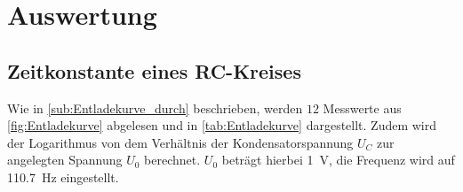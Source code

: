 \section{Auswertung}
\label{sec:Auswertung}

\subsection{Zeitkonstante eines RC-Kreises} %
\label{sub:Zeitkonstante_aus}

\noindent Wie in \autoref{sub:Entladekurve_durch} beschrieben, werden $12$ Messwerte aus \autoref{fig:Entladekurve} abgelesen und in \autoref{tab:Entladekurve} dargestellt.
Zudem wird der Logarithmus von dem Verhältnis der Kondensatorspannung $U_C$ zur angelegten Spannung $U_0$ berechnet. $U_0$ beträgt hierbei \qty{1}{\volt},
die Frequenz wird auf \qty{110.7}{\hertz} eingestellt.


